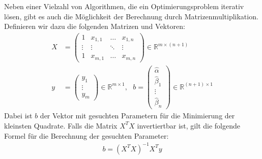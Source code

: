 Neben einer Vielzahl von Algorithmen, die ein Optimierungsproblem iterativ lösen, gibt es auch die Möglichkeit der Berechnung durch Matrizenmultiplikation. Definieren wir dazu die folgenden Matrizen und Vektoren:
\begin{align*}
    X &= \begin{pmatrix}
        1 & x_{1, 1} & \dots & x_{1, n} \\
        \vdots & \vdots & \ddots & \vdots \\
        1 & x_{m, 1} & \dots & x_{m, n}
    \end{pmatrix} \in \mathbb{R}^{m \times (n + 1)} \\
    y &= \begin{pmatrix}
        y_1 \\
        \vdots \\
        y_m
    \end{pmatrix} \in \mathbb{R}^{m \times 1}, ~~~
    b = \begin{pmatrix}
        \hat\alpha \\
        \hat\beta_1 \\
        \vdots \\
        \hat\beta_n
    \end{pmatrix} \in \mathbb{R}^{(n + 1) \times 1}
\end{align*}
Dabei ist $b$ der Vektor mit gesuchten Parametern für die Minimierung der kleinsten Quadrate. Falls die Matrix $X^T X$ invertiertbar ist, gilt die folgende Formel für die Berechnung der gesuchten Parameter:
\begin{align*}
    b = (X^T X)^{-1} X^T y
\end{align*}
